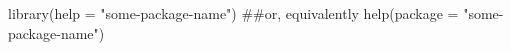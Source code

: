 \begin{Schunk}
\begin{Sinput}
 library(help = "some-package-name")
 ##or, equivalently
 help(package = "some-package-name")
\end{Sinput}
\end{Schunk}
